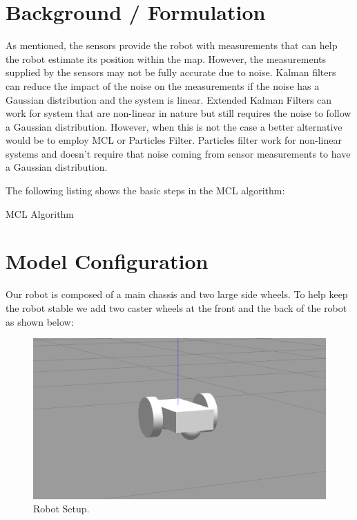 \documentclass[10pt,journal,compsoc]{IEEEtran}
\begin{document}
\section{Background / Formulation}
As mentioned, the sensors provide the robot with measurements that can help the robot estimate its position within the map. However, the measurements supplied by the sensors may not be fully accurate due to noise. Kalman filters can reduce the impact of the noise on the measurements if the noise has a Gaussian distribution and the system is linear. Extended Kalman Filters can work for system that are non-linear in nature but still requires the noise to follow a Gaussian distribution. However, when this is not the case a better alternative would be to employ MCL or Particles Filter. Particles filter work for non-linear systems and doesn't require that noise coming from sensor measurements to have a Gaussian distribution.

The following listing shows the basic steps in the MCL algorithm:

\begin{algorithm}
\SetAlgoLined
\caption{MCL Algorithm}
\end{algorithm}

\section{Model Configuration}
Our robot is composed of a main chassis and two large side wheels. To help keep the robot stable we add two caster wheels at the front and the back of the robot as shown below:
\begin{figure}[thpb]
      \centering
      \includegraphics[width=\linewidth]{gazebo-robot.png}
      \caption{Robot Setup.}
      \label{fig:network-training}
\end{figure}
\end{document}
